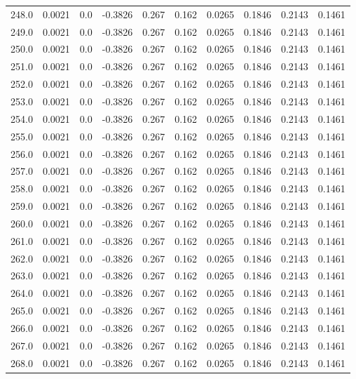 \begin{longtable}{lrrrrrrrrr}
248.0 & 0.0021 & 0.0 & -0.3826 & 0.267 & 0.162 & 0.0265 & 0.1846 & 0.2143 & 0.1461 \\
249.0 & 0.0021 & 0.0 & -0.3826 & 0.267 & 0.162 & 0.0265 & 0.1846 & 0.2143 & 0.1461 \\
250.0 & 0.0021 & 0.0 & -0.3826 & 0.267 & 0.162 & 0.0265 & 0.1846 & 0.2143 & 0.1461 \\
251.0 & 0.0021 & 0.0 & -0.3826 & 0.267 & 0.162 & 0.0265 & 0.1846 & 0.2143 & 0.1461 \\
252.0 & 0.0021 & 0.0 & -0.3826 & 0.267 & 0.162 & 0.0265 & 0.1846 & 0.2143 & 0.1461 \\
253.0 & 0.0021 & 0.0 & -0.3826 & 0.267 & 0.162 & 0.0265 & 0.1846 & 0.2143 & 0.1461 \\
254.0 & 0.0021 & 0.0 & -0.3826 & 0.267 & 0.162 & 0.0265 & 0.1846 & 0.2143 & 0.1461 \\
255.0 & 0.0021 & 0.0 & -0.3826 & 0.267 & 0.162 & 0.0265 & 0.1846 & 0.2143 & 0.1461 \\
256.0 & 0.0021 & 0.0 & -0.3826 & 0.267 & 0.162 & 0.0265 & 0.1846 & 0.2143 & 0.1461 \\
257.0 & 0.0021 & 0.0 & -0.3826 & 0.267 & 0.162 & 0.0265 & 0.1846 & 0.2143 & 0.1461 \\
258.0 & 0.0021 & 0.0 & -0.3826 & 0.267 & 0.162 & 0.0265 & 0.1846 & 0.2143 & 0.1461 \\
259.0 & 0.0021 & 0.0 & -0.3826 & 0.267 & 0.162 & 0.0265 & 0.1846 & 0.2143 & 0.1461 \\
260.0 & 0.0021 & 0.0 & -0.3826 & 0.267 & 0.162 & 0.0265 & 0.1846 & 0.2143 & 0.1461 \\
261.0 & 0.0021 & 0.0 & -0.3826 & 0.267 & 0.162 & 0.0265 & 0.1846 & 0.2143 & 0.1461 \\
262.0 & 0.0021 & 0.0 & -0.3826 & 0.267 & 0.162 & 0.0265 & 0.1846 & 0.2143 & 0.1461 \\
263.0 & 0.0021 & 0.0 & -0.3826 & 0.267 & 0.162 & 0.0265 & 0.1846 & 0.2143 & 0.1461 \\
264.0 & 0.0021 & 0.0 & -0.3826 & 0.267 & 0.162 & 0.0265 & 0.1846 & 0.2143 & 0.1461 \\
265.0 & 0.0021 & 0.0 & -0.3826 & 0.267 & 0.162 & 0.0265 & 0.1846 & 0.2143 & 0.1461 \\
266.0 & 0.0021 & 0.0 & -0.3826 & 0.267 & 0.162 & 0.0265 & 0.1846 & 0.2143 & 0.1461 \\
267.0 & 0.0021 & 0.0 & -0.3826 & 0.267 & 0.162 & 0.0265 & 0.1846 & 0.2143 & 0.1461 \\
268.0 & 0.0021 & 0.0 & -0.3826 & 0.267 & 0.162 & 0.0265 & 0.1846 & 0.2143 & 0.1461 \\

\end{longtable}
